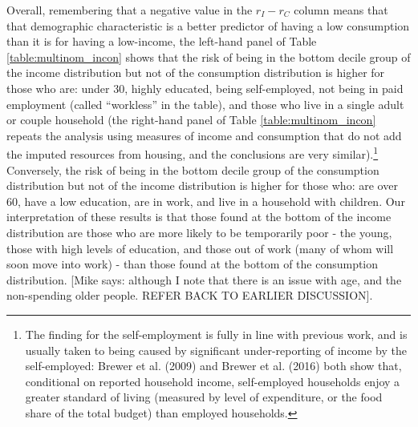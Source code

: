 
Overall, remembering that a negative value in the $r_{I}-r_{C}$ column means that that demographic characteristic is a better predictor of having a low consumption than it is for having a low-income, the left-hand panel of Table \ref{table:multinom_incon} shows that the risk of being in the bottom decile group of the income distribution but not of the consumption distribution is higher for those who are: under 30, highly educated, being self-employed, not being in paid employment (called ``workless'' in the table), and those who live in a single adult or couple household (the right-hand panel of Table \ref{table:multinom_incon} repeats the analysis using measures of income and consumption that do not add the imputed resources from housing, and the conclusions are very similar).\footnote{The finding for the self-employment is fully in line with previous work, and is usually taken to being caused by significant under-reporting of income by the self-employed: Brewer et al. (2009) and Brewer et al. (2016) both show that, conditional on reported household income, self-employed households enjoy a greater standard of living (measured by level of expenditure, or the food share of the total budget) than employed households.} Conversely, the risk of being in the bottom decile group of the consumption distribution but not of the income distribution is higher for those who: are over 60, have a low education, are in work, and live in a household with children. Our interpretation of these results is that those found at the bottom of the income distribution are those who are more likely to be temporarily poor - the young, those with high levels of education, and those out of work (many of whom will soon move into work) - than those found at the bottom of the consumption distribution. [Mike says: although I note that there is an issue with age, and the non-spending older people. REFER BACK TO EARLIER DISCUSSION].  

